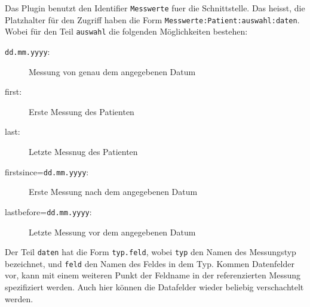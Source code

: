 \documentclass[a4paper]{scrartcl}
\begin{document}
Das Plugin benutzt den Identifier \texttt{Messwerte} fuer die Schnittstelle. Das
heisst, die Platzhalter für den Zugriff haben die Form 
\texttt{Messwerte:Patient:auswahl:daten}. Wobei für den Teil \texttt{auswahl} die
folgenden Möglichkeiten bestehen:
\begin{description}
    \item[\texttt{dd.mm.yyyy}:] Messung von genau dem angegebenen Datum
    \item[first:] Erste Messung des Patienten
    \item[last:] Letzte Messnug des Patienten
    \item[firstsince=\texttt{dd.mm.yyyy}:] Erste Messung nach dem angegebenen
                                           Datum
    \item[lastbefore=\texttt{dd.mm.yyyy}:] Letzte Messung vor dem angegebenen
                                           Datum
\end{description}

Der Teil \texttt{daten} hat die Form \texttt{typ.feld}, wobei \texttt{typ} den
Namen des Messungstyp bezeichnet, und \texttt{feld} den Namen des Feldes in dem
Typ. Kommen Datenfelder vor, kann mit einem weiteren Punkt der Feldname in der
referenzierten Messung spezifiziert werden. Auch hier können die Datafelder
wieder beliebig verschachtelt werden.
\end{document}
